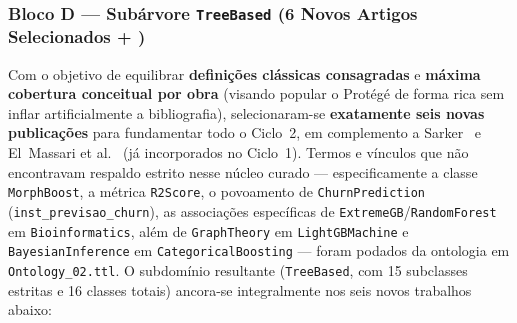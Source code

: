 \documentclass[11pt,a4paper]{article}
\newcommand{\onto}[1]{\texttt{#1}}
\begin{document}
\subsubsection{Bloco D --- Subárvore \onto{TreeBased} (6 Novos Artigos Selecionados + \cite{sarker2021ml})}

Com o objetivo de equilibrar \textbf{definições clássicas consagradas} e \textbf{máxima cobertura conceitual por obra} (visando popular o Protégé de forma rica sem inflar artificialmente a bibliografia), selecionaram-se \textbf{exatamente seis novas publicações} para fundamentar todo o Ciclo~2, em complemento a Sarker~\cite{sarker2021ml} e El~Massari et al.~\cite{elmassari2022diabetes} (já incorporados no Ciclo~1). Termos e vínculos que não encontravam respaldo estrito nesse núcleo curado --- especificamente a classe \onto{MorphBoost}, a métrica \onto{R2Score}, o povoamento de \onto{ChurnPrediction} (\onto{inst\_previsao\_churn}), as associações específicas de \onto{ExtremeGB}/\onto{RandomForest} em \onto{Bioinformatics}, além de \onto{GraphTheory} em \onto{LightGBMachine} e \onto{BayesianInference} em \onto{CategoricalBoosting} --- foram podados da ontologia em \texttt{Ontology\_02.ttl}. O subdomínio resultante (\onto{TreeBased}, com 15 subclasses estritas e 16 classes totais) ancora-se integralmente nos seis novos trabalhos abaixo:
\end{document}

